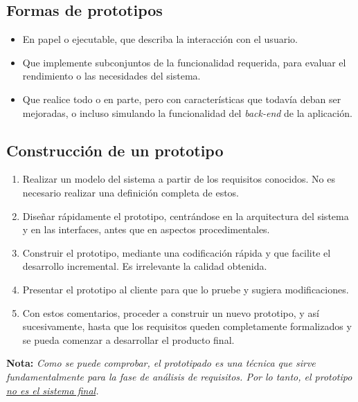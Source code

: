 \subsection{Formas de prototipos}

\begin{itemize}
   \item En papel o ejecutable, que describa la interacción con el usuario.
   \item Que implemente subconjuntos de la funcionalidad requerida, para evaluar el rendimiento o las necesidades del sistema.
   \item Que realice todo o en parte, pero con características que todavía deban ser mejoradas, o incluso simulando la funcionalidad del \textit{back-end} de la aplicación.
\end{itemize}

\subsection{Construcción de un prototipo}

\begin{enumerate}
   \item Realizar un modelo del sistema a partir de los requisitos conocidos. No es necesario realizar una definición completa de estos.
   \item Diseñar rápidamente el prototipo, centrándose en la arquitectura del sistema y en las interfaces, antes que en aspectos procedimentales.
   \item Construir el prototipo, mediante una codificación rápida y que facilite el desarrollo incremental. Es irrelevante la calidad obtenida.
   \item Presentar el prototipo al cliente para que lo pruebe y sugiera modificaciones.
   \item Con estos comentarios, proceder a construir un nuevo prototipo, y así sucesivamente, hasta que los requisitos queden completamente formalizados y se pueda comenzar a desarrollar el producto final.
\end{enumerate}

\textbf{Nota:} \textit{Como se puede comprobar, el prototipado es una técnica que sirve fundamentalmente para la fase de análisis de requisitos. Por lo tanto, el prototipo \uline{no es el sistema final}.}

